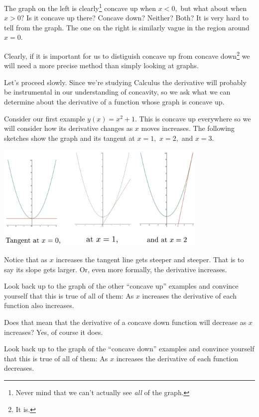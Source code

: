 The graph on the left is clearly\footnote{Never mind that we can't
  actually see \emph{all} of the graph.}  concave up when $x<0,$ but
what about when $x>0?$ Is it concave up there? Concave down?  Neither?
Both? It is very hard to tell from the graph.  The one on the right is
similarly vague in the region around $x=0.$

Clearly, if it is important for us to distiguish concave up from
concave down\footnote{It is.} we will need a more precise method
than simply looking at graphs.

Let's proceed slowly. Since we're studying Calculus the derivative
will probably be instrumental in our understanding of concavity, so we
ask what we can determine about the derivative of a function whose
graph is concave up.

Consider our first example $y(x) = x^2+1.$ This is concave up
everywhere so we will consider how its derivative changes as $x$ moves
increases. The following sketches show the graph and
its tangent at $x=1,$ $x=2,$ and $x=3.$\\
\centerline{\includegraphics*[height=2in,width=4in]{Figures/ConcaveUpWithTangent}}
Notice that as $x$ increases the tangent line gets steeper and
steeper. That is to say its slope gets larger. Or, even more formally,
the derivative increases.
\begin{embeddedproblem}{}
  Look back up to the graph of the other ``concave up'' examples and
  convince yourself that this is true of all of them: As $x$ increases
  the derivative of each function also increases.
\end{embeddedproblem}

Does that mean that the derivative of a concave down function will
decrease as $x$ increases? Yes, of course it does.
\begin{embeddedproblem}{}
  Look back up to the graph of the  ``concave down'' examples and
  convince yourself that this is true of all of them: As $x$ increases
  the derivative of each function decreases.
\end{embeddedproblem}

